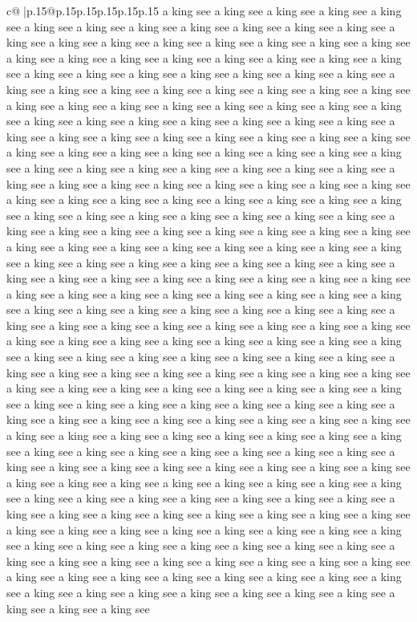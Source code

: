 \documentclass{article}
\begin{document}
{\begin{supertabular}{c@{$\;$}|p{.15\linewidth}@{}p{.15\linewidth}p{.15\linewidth}p{.15\linewidth}p{.15\linewidth}p{.15\linewidth}}
{{{a king see a king see a king see a king see a king see a king see a king see a king see a king see a king see a king see a king see a king see a king see a king see a king see a king see a king see a king see a king see a king see a king see a king see a king see a king see a king see a king see a king see a king see a king see a king see a king see a king see a king see a king see a king see a king see a king see a king see a king see a king see a king see a king see a king see a king see a king see a king see a king see a king see a king see a king see a king see a king see a king see a king see a king see a king see a king see a king see a king see a king see a king see a king see a king see a king see a king see a king see a king see a king see a king see a king see a king see a king see a king see a king see a king see a king see a king see a king see a king see a king see a king see a king see a king see a king see a king see a king see a king see a king see a king see a king see a king see a king see a king see a king see a king see a king see a king see a king see a king see a king see a king see a king see a king see a king see a king see a king see a king see a king see a king see a king see a king see a king see a king see a king see a king see a king see a king see a king see a king see a king see a king see a king see a king see a king see a king see a king see a king see a king see a king see a king see a king see a king see a king see a king see a king see a king see a king see a king see a king see a king see a king see a king see a king see a king see a king see a king see a king see a king see a king see a king see a king see a king see a king see a king see a king see a king see a king see a king see a king see a king see a king see a king see a king see a king see a king see a king see a king see a king see a king see a king see a king see a king see a king see a king see a king see a king see a king see a king see a king see a king see a king see a king see a king see a king see a king see a king see a king see a king see a king see a king see a king see a king see a king see a king see a king see a king see a king see a king see a king see a king see a king see a king see a king see a king see a king see a king see a king see a king see a king see a king see a king see a king see a king see a king see a king see a king see a king see a king see a king see a king see a king see a king see a king see a king see a king see a king see a king see a king see a king see a king see a king see a king see a king see a king see a king see a king see a king see a king see a king see a king see a king see a king see a king see a king see a king see a king see a king see a king see a king see a king see a king see a king see a king see a king see a king see a king see a king see a king see a king see a king see a king see a king see a king see a king see a king see a king see a king see a king see a king see a king see a king see a king see a king see a king see a king see a king see a king see a king see a king see a king see a king see a king see a king see a king see a king see a king see a king see a king see a king see a king see }}}
\end{supertabular}}
\end{document}
